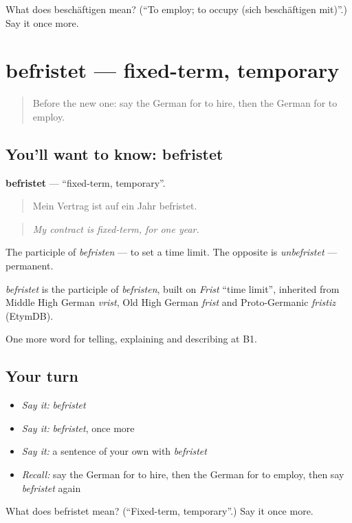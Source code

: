 \begin{tcolorbox}[breakable,colback=teal!4,colframe=teal!35!black,title={Before you move on}]
What does beschäftigen mean? (\textquotedblleft{}To employ; to occupy (sich beschäftigen mit)\textquotedblright{}.) Say it once more.
\end{tcolorbox}
\section[befristet]{befristet — fixed-term, temporary}

\label{lesson:GE-C350-befristet}



\begin{quote}
Before the new one: say the German for to hire, then the German for to employ.
\end{quote}

\subsection*{You'll want to know: befristet}
\textbf{befristet} — \textquotedblleft{}fixed-term, temporary\textquotedblright{}.

\begin{quote}
Mein Vertrag ist auf ein Jahr befristet.
\end{quote}

\begin{quote}
\emph{My contract is fixed-term, for one year.}
\end{quote}

The participle of \emph{befristen} — to set a time limit. The opposite is \emph{unbefristet} — permanent.

\begin{cousinweb}
\emph{befristet} is the participle of \emph{befristen}, built on \emph{Frist} \textquotedblleft{}time limit\textquotedblright{}, inherited from Middle High German \emph{vrist}, Old High German \emph{frist} and Proto-Germanic \emph{fristiz} (EtymDB).
\end{cousinweb}

\begin{grammarlens}[title={What you've built}]
One more word for telling, explaining and describing at B1.
\end{grammarlens}

\subsection*{Your turn}
\begin{itemize}
\raggedright
  \item \emph{Say it:} \emph{befristet}
  \item \emph{Say it:} \emph{befristet}, once more
  \item \emph{Say it:} a sentence of your own with \emph{befristet}
  \item \emph{Recall:} say the German for to hire, then the German for to employ, then say \emph{befristet} again
\end{itemize}

\begin{tcolorbox}[breakable,colback=teal!4,colframe=teal!35!black,title={Before you move on}]
What does befristet mean? (\textquotedblleft{}Fixed-term, temporary\textquotedblright{}.) Say it once more.
\end{tcolorbox}
